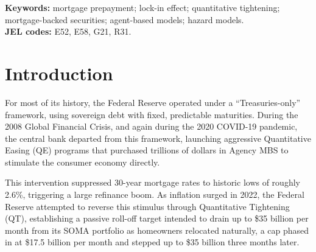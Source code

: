 \documentclass[12pt]{article}
\begin{document}
\begin{abstract}
design. An agent-based model of the moving decision recovers 13.6\% averaged across seeds, though a cross-design variant recalibrated on real loan covariates recovers 59.3\% on the frozen seed and 60.2\% averaged over fifty seeds (76.3\% reweighted to the book's composition; 50.9\% and 51.9\% on the book's own scheduled amortization, where sixteen of fifty seeds fall below the threshold). The contrast cannot be cleanly attributed to modeling paradigm. The mobility cost is real. The institutional cash-flow cost is small; its sign turns on the transplant's anchor, not on any within-anchor sensitivity sweep: importing Denmark's baseline mobility along with its payoff rule yields roughly $-\$100$ billion, while a transplant changing only the payoff rule yields $+\$61$ billion at the in-sample calibration point and $+\$28$ billion at the off-window calibration the headline marginal uses. The latter's positivity follows from anchoring the Danish leg at the U.S. zero-gap hazard on a book out of the money almost everywhere; the informative quantity there is the magnitude, not the sign.
\end{abstract}

\vspace{0.5\baselineskip}
{\footnotesize\noindent\textbf{Keywords:} mortgage prepayment; lock-in effect; quantitative tightening; mortgage-backed securities; agent-based models; hazard models.\\
\textbf{JEL codes:} E52, E58, G21, R31.\par}
\newpage
\section{Introduction}\label{sec:intro}

For most of its history, the Federal Reserve operated under a ``Treasuries-only'' framework, using sovereign debt with fixed, predictable maturities. During the 2008 Global Financial Crisis, and again during the 2020 COVID-19 pandemic, the central bank departed from this framework, launching aggressive Quantitative Easing (QE) programs that purchased trillions of dollars in Agency MBS to stimulate the consumer economy directly.

This intervention suppressed 30-year mortgage rates to historic lows of roughly 2.6\%, triggering a large refinance boom. As inflation surged in 2022, the Federal Reserve attempted to reverse this stimulus through Quantitative Tightening (QT), establishing a passive roll-off target intended to drain up to \$35 billion per month from its SOMA portfolio as homeowners relocated naturally, a cap phased in at \$17.5 billion per month and stepped up to \$35 billion three months later.
\end{document}
